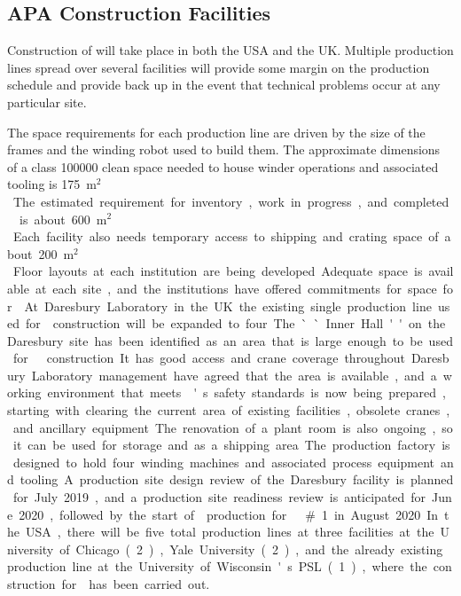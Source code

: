 \subsection{APA Construction Facilities}
\label{sec:fdsp-apa-prod-facility}

Construction of   will take place in both the USA and the UK.  Multiple  production lines spread over several facilities will provide some margin on the production schedule and provide back up in the event that technical problems occur at any particular site. 

The space requirements for each production line are driven by the size of the  frames and the winding robot used to build them. The approximate dimensions of a class \num{100000} clean space needed to house winder operations and associated tooling is \SI{175}{m$^2$}. The estimated requirement for inventory, work in progress, and completed  is about \SI{600}{m$^2$}. Each facility  also needs temporary access to shipping and crating space of about \SI{200}{m$^2$}. Floor layouts at each institution are being developed. Adequate space is available at each site, and the institutions have offered commitments for space for . 

At Daresbury Laboratory in the UK the existing single production line used for  construction will be expanded to four.  The ``Inner Hall'' on the Daresbury site has been identified as an area that is large enough to be used for   construction. It has good access and crane coverage throughout. Daresbury Laboratory management have agreed that the area is available, and a working environment that meets 's safety standards is now being prepared, starting with clearing the current area of existing facilities, obsolete cranes, and ancillary equipment. The renovation of a plant room is also ongoing, so it can be used for storage and as a shipping area. The production factory is designed to hold four winding machines and associated process equipment and tooling.  A production site design review of the Daresbury facility is planned for July 2019, and a production site readiness review is anticipated for June 2020, followed by the start of  production for   \#1 in August 2020. 

In the USA, there will be five total production lines at three facilities at the University of Chicago (2), Yale University (2), and the already existing production line at the University of Wisconsin's PSL (1),  where the construction for  has been carried out. 

